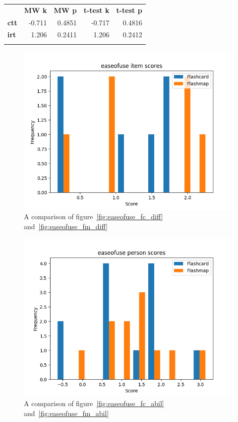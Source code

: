 \begin{longtable}[c]{@{}lrrrr@{}}
\toprule\addlinespace
& \textbf{MW k} & \textbf{MW p} &
\textbf{t-test k} & \textbf{t-test p}
\\\addlinespace
\midrule
\textbf{ctt} & -0.711 & 0.4851 & -0.717 & 0.4816
\\\addlinespace
\textbf{irt} & 1.206 & 0.2411 & 1.206 & 0.2412
\\\addlinespace
\bottomrule
    \label{tab:easeofuse_comp}
\end{longtable}

\begin{figure}
    \centering
    \includegraphics[width=.7\textwidth]{img/easeofuse_diff.png}
    \caption{A comparison of figure~\protect\ref{fig:easeofuse_fc_diff} and~\protect\ref{fig:easeofuse_fm_diff}}
    \label{fig:easeofuse_diff}
\end{figure}
\begin{figure}
    \centering
    \includegraphics[width=.7\textwidth]{img/easeofuse_abil.png}
    \caption{A comparison of figure~\protect\ref{fig:easeofuse_fc_abil} and~\protect\ref{fig:easeofuse_fm_abil}}
    \label{fig:easeofuse_abil}
\end{figure}
